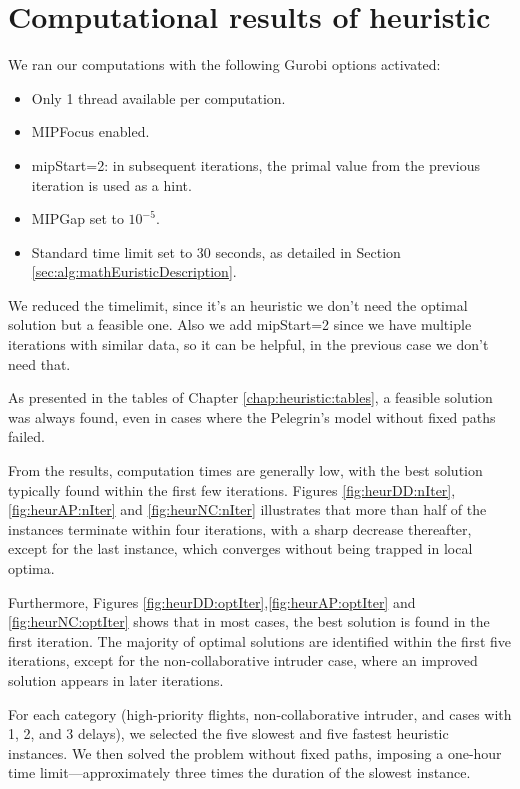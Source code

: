 \documentclass[../../thesis.tex]{subfiles}
\begin{document}
\section{Computational results of heuristic}

We ran our computations with the following Gurobi options activated:
\begin{itemize}
    \item Only 1 thread available per computation.
    \item MIPFocus enabled.
    \item mipStart=2: in subsequent iterations, the primal value from the previous iteration is used as a hint.
    \item MIPGap set to $10^{-5}$.
    \item Standard time limit set to $30$ seconds, as detailed in Section \ref{sec:alg:mathEuristicDescription}.
\end{itemize}

We reduced the timelimit, since it's an heuristic we don't need the optimal solution but a feasible one.
Also we add mipStart=2 since we have multiple iterations with similar data, so it can be helpful, in the previous case we don't need that.

As presented in the tables of Chapter \ref{chap:heuristic:tables}, a feasible solution was always found, even in cases where the Pelegrin's model without fixed paths failed.

From the results, computation times are generally low, with the best solution typically found within the first few iterations. Figures \ref{fig:heurDD:nIter},\ref{fig:heurAP:nIter} and \ref{fig:heurNC:nIter} illustrates that more than half of the instances terminate within four iterations, with a sharp decrease thereafter, except for the last instance, which converges without being trapped in local optima.

Furthermore, Figures \ref{fig:heurDD:optIter},\ref{fig:heurAP:optIter} and \ref{fig:heurNC:optIter} shows that in most cases, the best solution is found in the first iteration. The majority of optimal solutions are identified within the first five iterations, except for the non-collaborative intruder case, where an improved solution appears in later iterations.

For each category (high-priority flights, non-collaborative intruder, and cases with 1, 2, and 3 delays), we selected the five slowest and five fastest heuristic instances. We then solved the problem without fixed paths, imposing a one-hour time limit—approximately three times the duration of the slowest instance.
\end{document}
